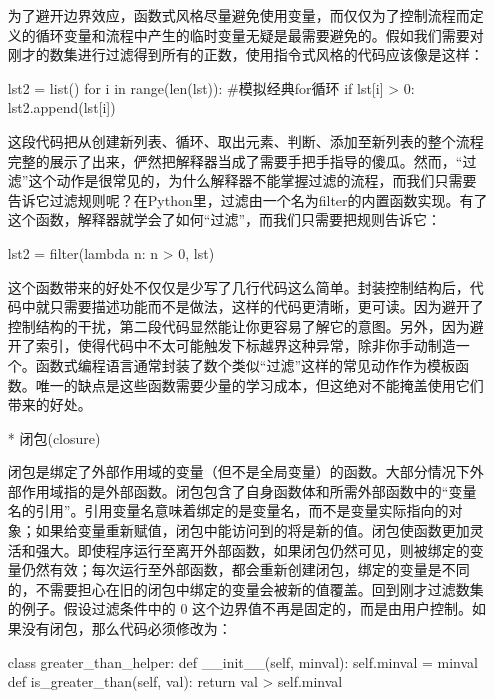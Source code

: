 \documentclass[12pt,a4paper]{report}
\begin{document}
\begin{enumerate}
    为了避开边界效应，函数式风格尽量避免使用变量，而仅仅为了控制流程而定义的循环变量和流程中产生的临时变量无疑是最需要避免的。假如我们需要对刚才的数集进行过滤得到所有的正数，使用指令式风格的代码应该像是这样： 
    \begin{python}[moreemph={[4]42},caption={},label=ex1]
lst2 = list()
for i in range(len(lst)): #模拟经典for循环
    if lst[i] > 0:
    lst2.append(lst[i])
    \end{python}
    这段代码把从创建新列表、循环、取出元素、判断、添加至新列表的整个流程完整的展示了出来，俨然把解释器当成了需要手把手指导的傻瓜。然而，“过滤”这个动作是很常见的，为什么解释器不能掌握过滤的流程，而我们只需要告诉它过滤规则呢？在Python里，过滤由一个名为filter的内置函数实现。有了这个函数，解释器就学会了如何“过滤”，而我们只需要把规则告诉它： 
    \begin{python}[moreemph={[4]42},caption={},label=ex1]
lst2 = filter(lambda n: n > 0, lst)
    \end{python}
    这个函数带来的好处不仅仅是少写了几行代码这么简单。封装控制结构后，代码中就只需要描述功能而不是做法，这样的代码更清晰，更可读。因为避开了控制结构的干扰，第二段代码显然能让你更容易了解它的意图。另外，因为避开了索引，使得代码中不太可能触发下标越界这种异常，除非你手动制造一个。函数式编程语言通常封装了数个类似“过滤”这样的常见动作作为模板函数。唯一的缺点是这些函数需要少量的学习成本，但这绝对不能掩盖使用它们带来的好处。
\item[*]闭包(closure)

    闭包是绑定了外部作用域的变量（但不是全局变量）的函数。大部分情况下外部作用域指的是外部函数。闭包包含了自身函数体和所需外部函数中的“变量名的引用”。引用变量名意味着绑定的是变量名，而不是变量实际指向的对象；如果给变量重新赋值，闭包中能访问到的将是新的值。闭包使函数更加灵活和强大。即使程序运行至离开外部函数，如果闭包仍然可见，则被绑定的变量仍然有效；每次运行至外部函数，都会重新创建闭包，绑定的变量是不同的，不需要担心在旧的闭包中绑定的变量会被新的值覆盖。回到刚才过滤数集的例子。假设过滤条件中的 0 这个边界值不再是固定的，而是由用户控制。如果没有闭包，那么代码必须修改为： 
    \newpage
    \begin{python}[moreemph={[4]42},caption={},label=ex1]
class greater_than_helper:
    def __init__(self, minval):
        self.minval = minval
    def is_greater_than(self, val):
        return val > self.minval
 

\end{python}
\end{enumerate}
\end{document}
